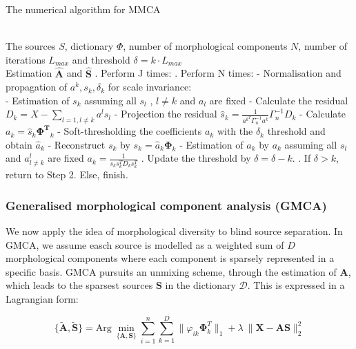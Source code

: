 \begin{algorithm}[!htbp] 
\caption{ The numerical algorithm for MMCA} 
\label{alg:Framwork} 
\begin{algorithmic}
\REQUIRE ~~\\%
The sources $S$, dictionary $\Phi$, number of morphological components $N$, number of iterations $L_{max}$ and threshold $\delta = k \cdot L_{max}$
\ENSURE ~~\\ %
Estimation $\hat{\mathbf{A}}$ and $\hat{\mathbf{S}}$
. Perform J times:
\STATE {}. Perform N times:
\STATE \qquad \quad - Normalisation and propagation of $a^k, s_k, \delta_k$ for scale invariance:\\
\STATE \qquad \quad - Estimation of $s_k$ assuming all $s_l$ , $l\neq k$ and $a_l$ are fixed
\STATE \qquad \quad - Calculate the residual $D_k = X - \sum_{l=1,l\neq k} a^ls_l$
\STATE \qquad \quad - Projection the residual $\hat{s}_k = \frac{1}{a^k^T\Gamma_n^{-1}a^k}\Gamma_n^{-1}D_k$
\STATE \qquad \quad - Calculate $a_k = \hat{s}_k \mathbf{\Phi^T}_k$
\STATE \qquad \quad - Soft-thresholding the coefficients $a_k$ with the $\delta_k$ threshold and obtain $\hat{a}_k$
\STATE \qquad \quad - Reconstruct $s_k$ by $s_k = \hat{a}_k \mathbf{\Phi}_k$
\STATE \qquad \quad - Estimation of $a_k$ by $a_k$ assuming all $s_l$ and $a^l_{l \neq k}$ are fixed $a_k = \frac{1}{s_k s_k^T D_ks_k^T}$
. Update the threshold by $\delta = \delta - k$.
. If $\delta  > k$, return to Step 2. Else, finish.
\end{algorithmic}
\end{algorithm}


\subsubsection{Generalised morphological component analysis (GMCA)}
We now apply the idea of morphological diversity to blind source separation. In GMCA, we assume easch source is modelled as a weighted sum of $D$ morphological components where each component is sparsely represented in a specific basis.
GMCA pursuits an unmixing scheme, through the estimation of $\mathbf{A}$, which leads to the sparsest sources $\mathbf{S}$ in the dictionary $\mathcal{D}$. This is expressed in a Lagrangian form:

\begin{equation}
    \{\mathbf{\tilde{A},\tilde{S}}\} = \text{Arg} \: \min_{\{\mathbf{A,S}\}} \sum_{i=1}^n \sum_{k=1}^D \lVert\varphi_{ik} \mathbf{\Phi}_k^T \rVert_{1} + \lambda \:\lVert \mathbf{X} - \mathbf{AS} \rVert^2_2
    \label{GMCAequation}
\end{equation}

